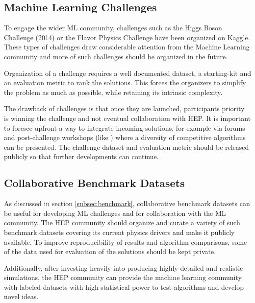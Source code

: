\subsection{Machine Learning Challenges}

To engage the wider ML community, challenges such as the Higgs Boson Challenge (2014) or the Flavor Physics Challenge \cite{NIPS:2015:ALEPH,FlavourDataMining} have been organized on Kaggle. These types of challenges draw considerable attention from the Machine Learning community and more of such challenges should be organized in the future.

Organization of a challenge requires a well documented dataset, a starting-kit and an evaluation metric to rank the solutions. This forces the organizers to simplify the problem as much as possible, while retaining its intrinsic complexity.

The drawback of challenges is that once they are launched, participants priority is winning the challenge and not eventual collaboration with HEP. It is important to foresee upfront a way to integrate incoming solutions, for example via forums and post-challenge workshops (like \cite{FlavourDataMining}) where a diversity of competitive algorithms can be presented. The challenge dataset and evaluation metric should be released publicly so that further developments can continue.

\subsection{Collaborative Benchmark Datasets}

As discussed in section \ref{subsec:benchmark}, collaborative benchmark datasets can be useful for developing ML challenges and for collaboration with the ML community. The HEP community should organize and curate a variety of such benchmark datasets covering its current physics drivers and make it publicly available. To improve reproducibility of results and algorithm comparisons, some of the data used for evaluation of the solutions should be kept private.


Additionally, after investing heavily into producing highly-detailed and realistic simulations, the HEP community can provide the machine learning community with labeled datasets with high statistical power to test algorithms and develop novel ideas.

